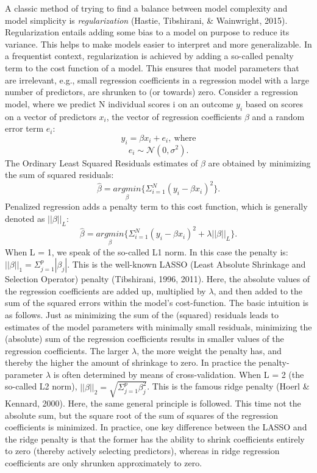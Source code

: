 \documentclass[
  man, donotrepeattitle,floatsintext]{apa6}
\begin{document}
A classic method of trying to find a balance between model complexity
and model simplicity is \emph{regularization} (Hastie, Tibshirani, \& Wainwright, 2015).
Regularization entails adding some bias to a model on purpose to reduce
its variance. This helps to make models easier to interpret and more
generalizable. In a frequentist context, regularization is achieved by
adding a so-called penalty term to the cost function of a model. This
ensures that model parameters that are irrelevant, e.g., small
regression coefficients in a regression model with a large number of
predictors, are shrunken to (or towards) zero. Consider a regression model,
where we predict N individual scores i on an outcome \(y_i\) based on
scores on a vector of predictors \(x_i\), the vector of regression
coefficients \(\beta\) and a random error term \(e_i\):
\[y_i = \beta x_i + e_i, \ \text{where} \]
\[e_i \sim \mathcal{N}(0, \sigma^2). \] The Ordinary Least Squared
Residuals estimates of \(\beta\) are obtained by minimizing the sum of
squared residuals:
\[ \hat{\beta} = \underset{\beta}{argmin} \{ \Sigma_{i=1}^N(y_i - \beta x_{i} )^2 \}.\]
Penalized regression adds a penalty term to this cost function, which
is generally denoted as \(||\beta||_L\):
\[ \hat{\beta} = \underset{\beta}{argmin} \{ \Sigma_{i=1}^N(y_i - \beta x_{i} )^2 + \lambda ||\beta||_{L} \}.\]
When L = 1, we speak of the so-called L1 norm. In this case the penalty
is: \(||\beta||_1 = \Sigma_{j=1}^p |\beta_j|\). This is the well-known
LASSO (Least Absolute Shrinkage and Selection Operator) penalty
(Tibshirani, 1996, 2011). Here, the
absolute values of the regression coefficients are added up, multiplied
by \(\lambda\), and then added to the sum of the squared errors within the
model's cost-function. The basic intuition is as follows. Just as
minimizing the sum of the (squared) residuals leads to estimates of the
model parameters with minimally small residuals, minimizing the
(absolute) sum of the regression coefficients results in smaller values
of the regression coefficients. The larger \(\lambda\), the more weight
the penalty has, and thereby the higher the amount of shrinkage to zero.
In practice the penalty-parameter \(\lambda\) is often determined by means of
cross-validation. When L = 2 (the so-called L2 norm),
\(||\beta||_2 = \sqrt{\Sigma_{j=1}^p \beta_j^2}\). This is the famous
ridge penalty (Hoerl \& Kennard, 2000). Here, the same general principle is
followed. This time not the absolute sum, but the square root of the sum
of squares of the regression coefficients is minimized. In practice, one
key difference between the LASSO and the ridge penalty is that the
former has the ability to shrink coefficients entirely to zero (thereby actively
selecting predictors), whereas in ridge regression coefficients are only
shrunken approximately to zero.
\end{document}

